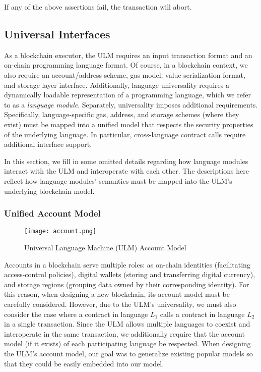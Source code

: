 \documentclass{article}
\newcommand{\ulm}{{ULM}}
\begin{document}
\noindent If any of the above assertions fail, the transaction will abort.


\subsection{Universal Interfaces}

As a blockchain executor, the \ulm{} requires an input transaction format and an on-chain programming language format.
Of course, in a blockchain context, we also require an account/address scheme, gas model, value serialization format, and storage layer interface.
Additionally, language universality requires a dynamically loadable representation of a programming language, which we refer to as a \emph{language module}.
Separately, universality imposes additional requirements.
Specifically, language-specific gas, address, and storage schemes (where they exist) must be mapped into a unified model that respects the security properties of the underlying language.
In particular, cross-language contract calls require additional interface support.


In this section, we fill in some omitted details regarding how language modules interact with the \ulm{} and interoperate with each other.
The descriptions here reflect how language modules' semantics must be mapped into the \ulm{}'s underlying blockchain model. 

\subsubsection{Unified Account Model}

\begin{figure}
    \centering
    \texttt{[image: account.png]}
    \caption{Universal Language Machine (ULM) Account Model}
    \label{fig:ulm-account}
\end{figure}

Accounts in a blockchain serve multiple roles: as on-chain identities (facilitating access-control policies), digital wallets (storing and transferring digital currency), and storage regions (grouping data owned by their corresponding identity).
For this reason, when designing a new blockchain, its account model must be carefully considered.
However, due to the \ulm{}'s universality, we must also consider the case where a contract in language $L_1$ calls a contract in language $L_2$ in a single transaction.
Since the \ulm{} allows multiple languages to coexist and interoperate in the same transaction, we additionally require that the account model (if it exists) of each participating language be respected.
When designing the \ulm{}'s account model, our goal was to generalize existing popular models so that they could be easily embedded into our model.
\end{document}
